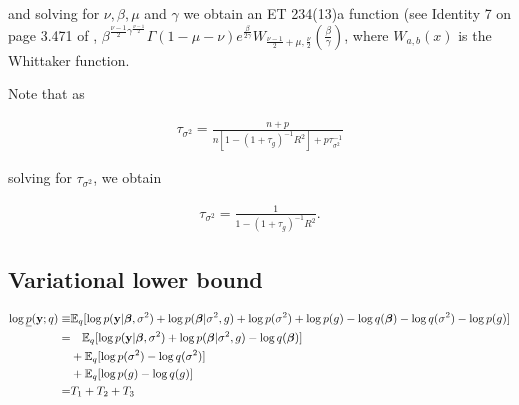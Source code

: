 \documentclass{amsart}[12pt]
\theoremstyle{definition}
\begin{document}
and solving for $\nu, \beta, \mu$ and $\gamma$ we obtain an ET 234(13)a function (see Identity 7 on 
page 3.471 of \cite{Gradshteyn1988},
$\beta^{\frac{\nu - 1}{2} \gamma^{\frac{\nu - 1}{2}}} \Gamma(1 - \mu - \nu) e^{\frac{\beta}{2 \gamma}} W_{\frac{\nu - 1}{2} + \mu, \frac{\nu}{2}}\left(\frac{\beta}{\gamma}\right)$, where $W_{a, b}(x)$ is the
Whittaker function.

Note that as

\begin{align*}
	\tau_{\sigma^2} = \frac{n + p}{n[1 - (1 + \tau_g)^{-1} R^2] + p \tau_{\sigma^2}^{-1}} 
\end{align*}

solving for $\tau_{\sigma^2}$, we obtain

\begin{align*}
	\tau_{\sigma^2} = \frac{1}{1 - (1 + \tau_g)^{-1} R^2}. 
\end{align*}

\subsection{Variational lower bound}

\begin{align*}
	\log \underline{p}({\bf y}; q) \equiv & \mathbb{E}_q [\log p({\bf y} | {\boldsymbol \beta}, \sigma^2) + \log p({\boldsymbol \beta} | \sigma^2, g)                        
	+ \log p(\sigma^2) + \log p(g) - \log q({\boldsymbol \beta})
	- \log q(\sigma^2) - \log p(g)] \\
	=                                 & \quad \mathbb{E}_q [\log p({\bf y}| {\boldsymbol \beta}, \sigma^2) + \log p({\boldsymbol \beta} | \sigma^2, g) - \log q({\boldsymbol \beta})] \\
	                                  & + \mathbb{E}_q [\log p(\sigma^2) - \log q(\sigma^2)]                                               \\
	                                  & + \mathbb{E}_q [\log p(g) - \log q(g)]                                                             \\
	=                                 & T_1 + T_2 + T_3                                                                            
\end{align*}
\end{document}
